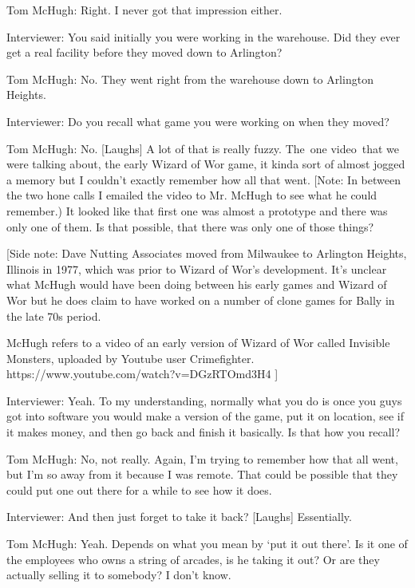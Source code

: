 \textcolor{interviewee}{Tom McHugh:} Right. I never got that impression either.

\textcolor{interviewer}{Interviewer:} You said initially you were working in the warehouse. Did they ever get a real facility before they moved down to Arlington?

\textcolor{interviewee}{Tom McHugh:} No. They went right from the warehouse down to Arlington Heights.

\textcolor{interviewer}{Interviewer:} Do you recall what game you were working on when they moved? 

\textcolor{interviewee}{Tom McHugh:} No. [Laughs] A lot of that is really fuzzy. The one video that we were talking about, the early Wizard of Wor game, it kinda sort of almost jogged a memory but I couldn’t exactly remember how all that went. [Note: In between the two hone calls I emailed the video to Mr. McHugh to see what he could remember.) It looked like that first one was almost a prototype and there was only one of them. Is that possible, that there was only one of those things?

[Side note: Dave Nutting Associates moved from Milwaukee to Arlington Heights, Illinois in 1977, which was prior to Wizard of Wor’s development. It’s unclear what McHugh would have been doing between his early games and Wizard of Wor but he does claim to have worked on a number of clone games for Bally in the late 70s period.

McHugh refers to a video of an early version of Wizard of Wor called Invisible Monsters, uploaded by Youtube user Crimefighter. https://www.youtube.com/watch?v=DGzRTOmd3H4 ]

\textcolor{interviewer}{Interviewer:} Yeah. To my understanding, normally what you do is once you guys got into software you would make a version of the game, put it on location, see if it makes money, and then go back and finish it basically. Is that how you recall?

\textcolor{interviewee}{Tom McHugh:} No, not really. Again, I’m trying to remember how that all went, but I’m so away from it because I was remote. That could be possible that they could put one out there for a while to see how it does.

\textcolor{interviewer}{Interviewer:} And then just forget to take it back? [Laughs] Essentially.

\textcolor{interviewee}{Tom McHugh:} Yeah. Depends on what you mean by ‘put it out there’. Is it one of the employees who owns a string of arcades, is he taking it out? Or are they actually selling it to somebody? I don’t know.

